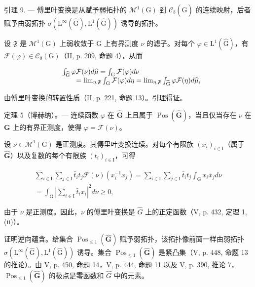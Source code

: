 引理 9. --- 傅里叶变换是从赋予弱拓扑的 \(\mathcal{M}^{1}(\mathrm{G})\) 到 \(\mathcal{C}_{b}(\widehat{\mathrm{G}})\) 的连续映射，后者赋予由弱拓扑 \(\sigma(\mathrm{L}^{\infty}(\widehat{\mathrm{G}}),\mathrm{L}^{1}(\widehat{\mathrm{G}}))\) 诱导的拓扑。

设 \(\mathfrak{F}\) 是 \(\mathcal{M}^1 (\mathrm{G})\) 上弱收敛于 G 上有界测度 \(\nu\) 的滤子。对每个 \(\varphi \in \mathrm{L}^1 (\widehat{\mathrm{G}})\)，有 \(\mathcal{F}(\varphi)\in \mathcal{C}_0(\mathrm{G})\)（II, p. 209, 命题 4），从而

\[
\begin{array}{r l} & {\int_ {\widehat {\mathrm{G}}} \varphi \mathcal {F} (\nu) d \widehat {\mu} = \int_ {\mathrm{G}} \mathcal {F} (\varphi) d \nu} \\ & {\qquad = \lim _ {\eta , \mathfrak {F}} \int_ {\mathrm{G}} \mathcal {F} (\varphi) d \eta = \lim _ {\eta , \mathfrak {F}} \int_ {\widehat {\mathrm{G}}} \varphi \mathcal {F} (\eta) d \widehat {\mu},} \end{array}
\]

由傅里叶变换的转置性质（II, p. 221, 命题 13）。引理得证。

定理 5（博赫纳）。--- 连续函数 \(\varphi\) 在 \(\widehat{\mathbf{G}}\) 上且属于 \(\operatorname{Pos}(\widehat{\mathbf{G}})\)，当且仅当存在 \(\nu\) 在 \(\mathbf{G}\) 上的有界正测度，使得 \(\varphi = \mathcal{F}(\nu)\)。

设 \(\nu \in \mathcal{M}^{1}(\mathrm{G})\) 是正测度。其傅里叶变换连续。对每个有限族 \((x_{i})_{i\in \mathrm{I}}\)（属于 \(\widehat{\mathbf{G}}\)）以及复数的每个有限族 \((t_i)_{i\in \mathrm{I}}\)，可得

\[
\begin{array}{r} \sum_ {i \in \mathrm{I}} \sum_ {j \in \mathrm{I}} \bar {t} _ {i} t _ {j} \mathcal {F} (\nu) (x _ {i} ^ {- 1} x _ {j}) = \sum_ {i \in \mathrm{I}} \sum_ {j \in \mathrm{I}} \bar {t} _ {i} t _ {j} \int_ {\mathrm{G}} x _ {i} \overline {{x}} _ {j} d \nu \\ = \int_ {\mathrm{G}} \left| \sum_ {i \in \mathrm{I}} \bar {t} _ {i} x _ {i} \right| ^ {2} d \nu \geqslant 0, \end{array}
\]

由于 \(\nu\) 是正测度。因此，\(\nu\) 的傅里叶变换是 \(\hat{G}\) 上的正定函数（V, p. 432, 定理 1, (ii)）。

证明逆向蕴含。给集合 \(\operatorname{Pos}_{\leqslant1}(\widehat{\mathbf{G}})\) 赋予弱拓扑，该拓扑像前面一样由弱拓扑 \(\sigma(\mathrm{L}^{\infty}(\widehat{\mathrm{G}}),\mathrm{L}^{1}(\widehat{\mathrm{G}}))\) 诱导。集合 \(\operatorname{Pos}_{\leqslant1}(\widehat{\mathbf{G}})\) 是紧凸集（V, p. 448, 命题 13 的推论）。由 V, p. 450, 命题 14，V, p. 444, 命题 11 以及 V, p. 390, 推论 7，\(\operatorname{Pos}_{\leqslant1}(\widehat{\mathbf{G}})\) 的极点是零函数和 \(\widehat{G}\) 中的元素。

